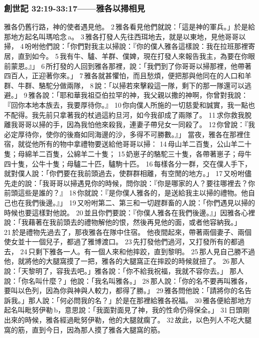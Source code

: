 \subsubsection{創世記 32:19-33:17——雅各以掃相見}
雅各仍舊行路，神的使者遇見他。 2 雅各看見他們就說：「這是神的軍兵。」於是給那地方起名叫瑪哈念 a。 3 雅各打發人先往西珥地去，就是以東地，見他哥哥以掃， 4 吩咐他們說：「你們對我主以掃說：『你的僕人雅各這樣說：我在拉班那裡寄居，直到如今。 5 我有牛、驢、羊群、僕婢，現在打發人來報告我主，為要在你眼前蒙恩。』」 6 所打發的人回到雅各那裡，說：「我們到了你哥哥以掃那裡，他帶著四百人，正迎著你來。」 7 雅各就甚懼怕，而且愁煩，便把那與他同在的人口和羊群、牛群、駱駝分做兩隊， 8 說：「以掃若來擊殺這一隊，剩下的那一隊還可以逃避。」 9 雅各說：「耶和華我祖亞伯拉罕的神，我父親以撒的神啊，你曾對我說：『回你本地本族去，我要厚待你。』 10 你向僕人所施的一切慈愛和誠實，我一點也不配得。我先前只拿著我的杖過這約旦河，如今我卻成了兩隊了。 11 求你救我脫離我哥哥以掃的手，因為我怕他來殺我，連妻子帶兒女一同殺了。 12 你曾說：『我必定厚待你，使你的後裔如同海邊的沙，多得不可勝數。』」
當夜，雅各在那裡住宿，就從他所有的物中拿禮物要送給他哥哥以掃： 14 母山羊二百隻，公山羊二十隻；母綿羊二百隻，公綿羊二十隻； 15 奶崽子的駱駝三十隻，各帶著崽子；母牛四十隻，公牛十隻；母驢二十匹，驢駒十匹。 16 每樣各分一群，交在僕人手下，就對僕人說：「你們要在我前頭過去，使群群相離，有空閒的地方。」 17 又吩咐儘先走的說：「我哥哥以掃遇見你的時候，問你說：『你是哪家的人？要往哪裡去？你前頭這些是誰的？』 18 你就說：『是你僕人雅各的，是送給我主以掃的禮物。他自己也在我們後邊。』」 19 又吩咐第二、第三和一切趕群畜的人說：「你們遇見以掃的時候也要這樣對他說。 20 並且你們要說：『你僕人雅各在我們後邊。』」因雅各心裡說：「我藉著在我前頭去的禮物解他的恨，然後再見他的面，或者他容納我。」 21 於是禮物先過去了，那夜雅各在隊中住宿。
他夜間起來，帶著兩個妻子、兩個使女並十一個兒子，都過了雅博渡口。 23 先打發他們過河，又打發所有的都過去， 24 只剩下雅各一人。有一個人來和他摔跤，直到黎明。 25 那人見自己勝不過他，就將他的大腿窩摸了一把，雅各的大腿窩正在摔跤的時候就扭了。 26 那人說：「天黎明了，容我去吧。」雅各說：「你不給我祝福，我就不容你去。」
那人說：「你名叫什麼？」他說：「我名叫雅各。」 28 那人說：「你的名不要再叫雅各，要叫以色列，因為你與神與人較力，都得了勝。」 29 雅各問他說：「請將你的名告訴我。」那人說：「何必問我的名？」於是在那裡給雅各祝福。 30 雅各便給那地方起名叫毗努伊勒 b，意思說：「我面對面見了神，我的性命仍得保全。」 31 日頭剛出來的時候，雅各經過毗努伊勒，他的大腿就瘸了。 32 故此，以色列人不吃大腿窩的筋，直到今日，因為那人摸了雅各大腿窩的筋。

